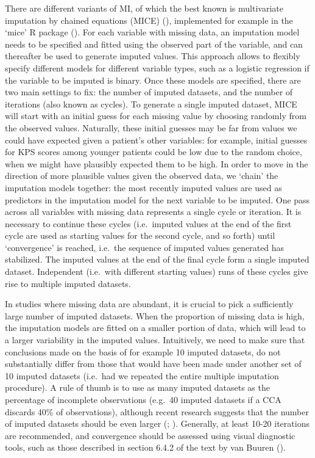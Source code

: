 \documentclass[
  letterpaper,
  paper=240mm:170mm,
  twoside=true,
  open=right,
  fontsize=10pt,
  pagesize=false,
  BCOR=15mm,
  DIV=14,
  headinclude=true,
  footinclude=false,
  headsepline=on]{scrbook}
\begin{document}
There are different variants of MI, of which the best known is
multivariate imputation by chained equations (MICE)
(), implemented for example in the `mice' R package
(). For each variable with missing data, an
imputation model needs to be specified and fitted using the observed
part of the variable, and can thereafter be used to generate imputed
values. This approach allows to flexibly specify different models for
different variable types, such as a logistic regression if the variable
to be imputed is binary. Once these models are specified, there are two
main settings to fix: the number of imputed datasets, and the number of
iterations (also known as cycles). To generate a single imputed dataset,
MICE will start with an initial guess for each missing value by choosing
randomly from the observed values. Naturally, these initial guesses may
be far from values we could have expected given a patient's other
variables: for example, initial guesses for KPS scores among younger
patients could be low due to the random choice, when we might have
plausibly expected them to be high. In order to move in the direction of
more plausible values given the observed data, we `chain' the imputation
models together: the most recently imputed values are used as predictors
in the imputation model for the next variable to be imputed. One pass
across all variables with missing data represents a single cycle or
iteration. It is necessary to continue these cycles (i.e.~imputed values
at the end of the first cycle are used as starting values for the second
cycle, and so forth) until `convergence' is reached, i.e.~the sequence
of imputed values generated has stabilized. The imputed values at the
end of the final cycle form a single imputed dataset. Independent
(i.e.~with different starting values) runs of these cycles give rise to
multiple imputed datasets.

In studies where missing data are abundant, it is crucial to pick a
sufficiently large number of imputed datasets. When the proportion of
missing data is high, the imputation models are fitted on a smaller
portion of data, which will lead to a larger variability in the imputed
values. Intuitively, we need to make sure that conclusions made on the
basis of for example 10 imputed datasets, do not substantially differ
from those that would have been made under another set of 10 imputed
datasets (i.e.~had we repeated the entire multiple imputation
procedure). A rule of thumb is to use as many imputed datasets as the
percentage of incomplete observations (e.g.~40 imputed datasets if a CCA
discards 40\% of observations), although recent research suggests that
the number of imputed datasets should be even larger
(; ). Generally, at least 10-20 iterations are recommended,
and convergence should be assessed using visual diagnostic tools, such
as those described in section 6.4.2 of the text by van Buuren
().
\end{document}
